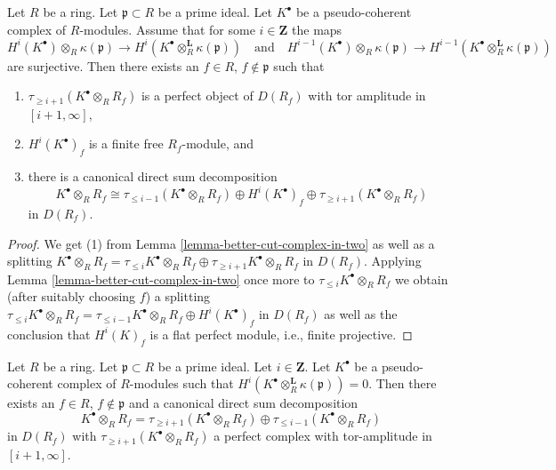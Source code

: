 \begin{lemma}
\label{lemma-isolate-a-cohomology-group}
Let $R$ be a ring. Let $\mathfrak p \subset R$ be a prime ideal.
Let $K^\bullet$ be a pseudo-coherent complex of $R$-modules.
Assume that for some $i \in \mathbf{Z}$ the maps
$$
H^i(K^\bullet) \otimes_R \kappa(\mathfrak p)
\longrightarrow
H^i(K^\bullet \otimes_R^{\mathbf{L}} \kappa(\mathfrak p))
\quad\text{and}\quad
H^{i - 1}(K^\bullet) \otimes_R \kappa(\mathfrak p)
\longrightarrow
H^{i - 1}(K^\bullet \otimes_R^{\mathbf{L}} \kappa(\mathfrak p))
$$
are surjective. Then there exists an $f \in R$, $f \not \in \mathfrak p$
such that
\begin{enumerate}
\item $\tau_{\geq i + 1}(K^\bullet \otimes_R R_f)$ is a perfect
object of $D(R_f)$ with tor amplitude in $[i + 1, \infty]$,
\item $H^i(K^\bullet)_f$ is a finite free $R_f$-module, and
\item there is a canonical direct sum decomposition
$$
K^\bullet \otimes_R R_f \cong
\tau_{\leq i - 1}(K^\bullet \otimes_R R_f) \oplus H^i(K^\bullet)_f \oplus
\tau_{\geq i + 1}(K^\bullet \otimes_R R_f)
$$
in $D(R_f)$.
\end{enumerate}
\end{lemma}

\begin{proof}
We get (1) from Lemma \ref{lemma-better-cut-complex-in-two} as well
as a splitting
$K^\bullet \otimes_R R_f = \tau_{\leq i}K^\bullet \otimes_R R_f \oplus
\tau_{\geq i + 1}K^\bullet \otimes_R R_f$
in $D(R_f)$. Applying Lemma \ref{lemma-better-cut-complex-in-two} once
more to $\tau_{\leq i}K^\bullet \otimes_R R_f$
we obtain (after suitably choosing $f$) a splitting
$\tau_{\leq i}K^\bullet \otimes_R R_f =
\tau_{\leq i - 1}K^\bullet \otimes_R R_f \oplus H^i(K^\bullet)_f$ in $D(R_f)$
as well as the conclusion that $H^i(K)_f$ is a flat perfect module, i.e.,
finite projective.
\end{proof}

\begin{lemma}
\label{lemma-cut-complex-in-two}
Let $R$ be a ring. Let $\mathfrak p \subset R$ be a prime ideal.
Let $i \in \mathbf{Z}$. Let $K^\bullet$ be a pseudo-coherent complex
of $R$-modules such that
$H^i(K^\bullet \otimes_R^{\mathbf{L}} \kappa(\mathfrak p)) = 0$.
Then there exists an $f \in R$, $f \not \in \mathfrak p$
and a canonical direct sum decomposition
$$
K^\bullet \otimes_R R_f =
\tau_{\geq i + 1}(K^\bullet \otimes_R R_f) \oplus
\tau_{\leq i - 1}(K^\bullet \otimes_R R_f)
$$
in $D(R_f)$ with $\tau_{\geq i + 1}(K^\bullet \otimes_R R_f)$ a perfect
complex with tor-amplitude in $[i + 1, \infty]$.
\end{lemma}


